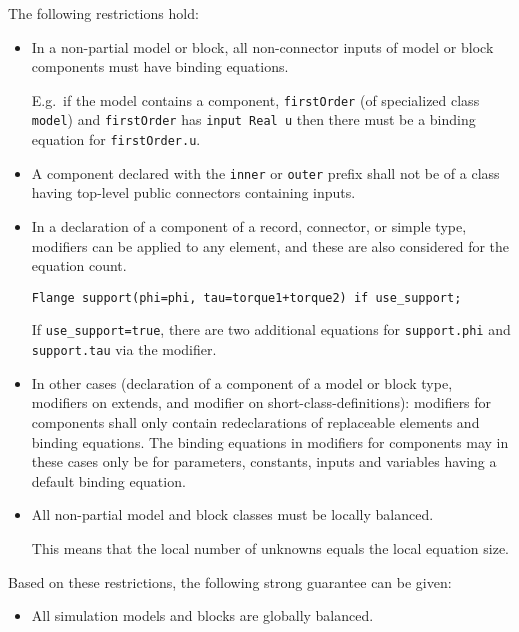 The following restrictions hold:
\begin{itemize}
\item
  In a non-partial model or block, all non-connector inputs of model or
  block components must have binding equations.
  \begin{nonnormative}
  E.g.\ if the model contains a component, \lstinline!firstOrder! (of specialized class \lstinline!model!) and \lstinline!firstOrder! has
  \lstinline!input Real u! then there must be a binding equation for \lstinline!firstOrder.u!.
  \end{nonnormative}
\item
  A component declared with the \lstinline!inner! or \lstinline!outer! prefix shall not be of a
  class having top-level public connectors containing inputs.
\item
  In a declaration of a component of a record, connector, or simple type, modifiers can be applied to any element, and these are also considered for the equation count.
\begin{example}
\begin{lstlisting}[language=modelica]
Flange support(phi=phi, tau=torque1+torque2) if use_support;
\end{lstlisting}
  If \lstinline!use_support=true!, there are two additional equations for
  \lstinline!support.phi! and \lstinline!support.tau! via the modifier.
\end{example}
\item
  In other cases (declaration of a component of a model or block type,
  modifiers on extends, and modifier on short-class-definitions):
  modifiers for components shall only contain redeclarations of
  replaceable elements and binding equations. The binding equations in
  modifiers for components may in these cases only be for parameters,
  constants, inputs and variables having a default binding equation.
\item
  All non-partial model and block classes must be locally balanced.
  \begin{nonnormative}
  This means that the local number of unknowns equals the local equation size.
  \end{nonnormative}
\end{itemize}

Based on these restrictions, the following strong guarantee can be given:
\begin{itemize}
\item All simulation models and blocks are globally balanced.
\end{itemize}

